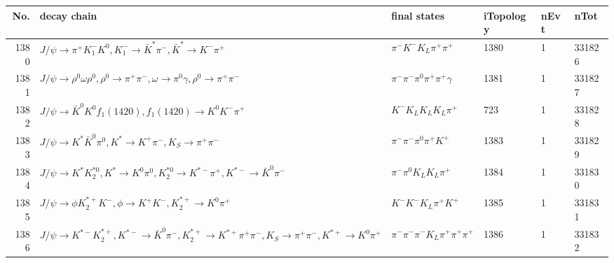 \begin{table}[htbp] 
\begin{center}
\begin{small}
\begin{tabular}{rlllll}\hline\hline
 No. & decay chain & final states &  iTopology & nEvt & nTot \\\hline
1380&$J/\psi       \rightarrow \pi^{+}        K_{1}^{-}      K^{0}          , K_{1}^{-}       \rightarrow \bar{K}^{*}   \pi^{-}        , \bar{K}^{*}    \rightarrow K^{-}          \pi^{+}        $&$\pi^{-}        K^{-}          K_{L}          \pi^{+}        \pi^{+}        $& 1380&    1&331826\\
1381&$J/\psi       \rightarrow \rho^{0}      \omega         \rho^{0}      , \rho^{0}       \rightarrow \pi^{+}        \pi^{-}        , \omega          \rightarrow \pi^{0}        \gamma       , \rho^{0}       \rightarrow \pi^{+}        \pi^{-}        $&$\pi^{-}        \pi^{-}        \pi^{0}        \pi^{+}        \pi^{+}        \gamma       $& 1381&    1&331827\\
1382&$J/\psi       \rightarrow \bar{K}^{0}   K^{0}          f_{1}(1420)    , f_{1}(1420)     \rightarrow K^{0}          K^{-}          \pi^{+}        $&$K^{-}          K_{L}          K_{L}          K_{L}          \pi^{+}        $&  723&    1&331828\\
1383&$J/\psi       \rightarrow K^{*}          \bar{K}^{0}   \pi^{0}        , K^{*}           \rightarrow K^{+}          \pi^{-}        , K_{S}           \rightarrow \pi^{+}        \pi^{-}        $&$\pi^{-}        \pi^{-}        \pi^{0}        \pi^{+}        K^{+}          $& 1383&    1&331829\\
1384&$J/\psi       \rightarrow K^{*}          K_2^{*0}       , K^{*}           \rightarrow K^{0}          \pi^{0}        , K_2^{*0}        \rightarrow K^{*-}         \pi^{+}        , K^{*-}          \rightarrow \bar{K}^{0}   \pi^{-}        $&$\pi^{-}        \pi^{0}        K_{L}          K_{L}          \pi^{+}        $& 1384&    1&331830\\
1385&$J/\psi       \rightarrow \phi           K_2^{*+}       K^{-}          , \phi            \rightarrow K^{+}          K^{-}          , K_2^{*+}        \rightarrow K^{0}          \pi^{+}        $&$K^{-}          K^{-}          K_{L}          \pi^{+}        K^{+}          $& 1385&    1&331831\\
1386&$J/\psi       \rightarrow K^{*-}         K_2^{*+}       , K^{*-}          \rightarrow \bar{K}^{0}   \pi^{-}        , K_2^{*+}        \rightarrow K^{*+}         \pi^{+}        \pi^{-}        , K_{S}           \rightarrow \pi^{+}        \pi^{-}        , K^{*+}          \rightarrow K^{0}          \pi^{+}        $&$\pi^{-}        \pi^{-}        \pi^{-}        K_{L}          \pi^{+}        \pi^{+}        \pi^{+}        $& 1386&    1&331832\\

\end{tabular}
\end{small}
\end{center}
\end{table}
